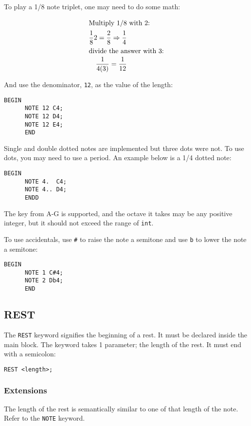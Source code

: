 \documentclass{article}
\begin{document}
To play a 1/8 note triplet, one may need to do some math:

\begin{align}
	\shortintertext{Multiply 1/8 with 2:}
	\frac{1}{8}2 = \frac{2}{8} \Rightarrow \frac{1}{4} \\
	\shortintertext{divide the answer with 3:}
	\frac{1}{4(3)} = \frac{1}{12}
\end{align}

And use the denominator, \verb+12+, as the value of the length:
\begin{Verbatim}[frame=single]
      BEGIN
      NOTE 12 C4;
      NOTE 12 D4;
      NOTE 12 E4;
      END
\end{Verbatim}

Single and double dotted notes are implemented but three dots were not. To use dots, you may need to use a period. An example below is a 1/4 dotted note:
\begin{Verbatim}[frame=single]
      BEGIN
      NOTE 4.  C4;
      NOTE 4.. D4;
      ENDD
\end{Verbatim}

The key from A-G is supported, and the octave it takes may be any positive integer, but
it should not exceed the range of \verb+int+. \newline

To use accidentals, use \verb+#+ to raise the note a semitone and use \verb+b+ to lower the
note a semitone:
\begin{Verbatim}[frame=single]
      BEGIN
      NOTE 1 C#4;
      NOTE 2 Db4;
      END
\end{Verbatim}

\subsection{REST}
The \verb+REST+ keyword signifies the beginning of a rest. It must be declared inside
the main block.
The keyword takes 1 parameter; the length of the rest. It must end with a semicolon:
\begin{Verbatim}[frame=single]
      REST <length>;
\end{Verbatim}

\subsubsection{Extensions}

The length of the rest is semantically similar to one of that length
of the note. Refer to the \verb+NOTE+ keyword.
\end{document}

